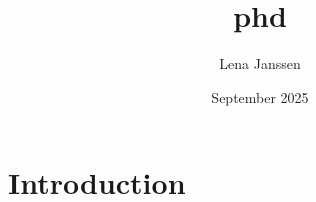 \documentclass{article}
\title{phd}
\author{Lena Janssen}
\date{September 2025}
\begin{document}
\maketitle

\section{Introduction}
\end{document}
